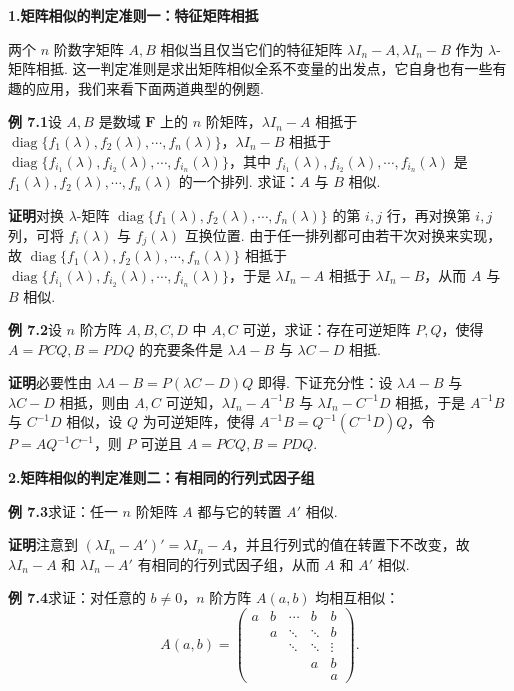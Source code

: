 \documentclass[UTF8,12pt,a4paper,fontset=fandol]{ctexart}
\begin{document}
\noindent\textbf{1.\quad 矩阵相似的判定准则一：特征矩阵相抵}

两个 $n$ 阶数字矩阵 $A,B$ 相似当且仅当它们的特征矩阵 $\lambda I_n-A,\lambda I_n-B$ 作为 $\lambda$-矩阵相抵. 这一判定准则是求出矩阵相似全系不变量的出发点，它自身也有一些有趣的应用，我们来看下面两道典型的例题.

\noindent\textbf{例 7.1}\quad 设 $A,B$ 是数域 $\mathbf{F}$ 上的 $n$ 阶矩阵，$\lambda I_n-A$ 相抵于 $\operatorname{diag}\{f_1(\lambda),f_2(\lambda),\cdots,f_n(\lambda)\}$，$\lambda I_n-B$ 相抵于 $\operatorname{diag}\{f_{i_1}(\lambda),f_{i_2}(\lambda),\cdots,f_{i_n}(\lambda)\}$，其中 $f_{i_1}(\lambda),f_{i_2}(\lambda),\cdots,f_{i_n}(\lambda)$ 是 $f_1(\lambda),f_2(\lambda),\cdots,f_n(\lambda)$ 的一个排列. 求证：$A$ 与 $B$ 相似.

\noindent\textbf{证明}\quad 对换 $\lambda$-矩阵 $\operatorname{diag}\{f_1(\lambda),f_2(\lambda),\cdots,f_n(\lambda)\}$ 的第 $i,j$ 行，再对换第 $i,j$ 列，可将 $f_i(\lambda)$ 与 $f_j(\lambda)$ 互换位置. 由于任一排列都可由若干次对换来实现，故 $\operatorname{diag}\{f_1(\lambda),f_2(\lambda),\cdots,f_n(\lambda)\}$ 相抵于 $\operatorname{diag}\{f_{i_1}(\lambda),f_{i_2}(\lambda),\cdots,f_{i_n}(\lambda)\}$，于是 $\lambda I_n-A$ 相抵于 $\lambda I_n-B$，从而 $A$ 与 $B$ 相似.

\noindent\textbf{例 7.2}\quad 设 $n$ 阶方阵 $A,B,C,D$ 中 $A,C$ 可逆，求证：存在可逆矩阵 $P,Q$，使得 $A=PCQ,B=PDQ$ 的充要条件是 $\lambda A-B$ 与 $\lambda C-D$ 相抵.

\noindent\textbf{证明}\quad 必要性由 $\lambda A-B=P(\lambda C-D)Q$ 即得. 下证充分性：设 $\lambda A-B$ 与 $\lambda C-D$ 相抵，则由 $A,C$ 可逆知，$\lambda I_n-A^{-1}B$ 与 $\lambda I_n-C^{-1}D$ 相抵，于是 $A^{-1}B$ 与 $C^{-1}D$ 相似，设 $Q$ 为可逆矩阵，使得 $A^{-1}B=Q^{-1}(C^{-1}D)Q$，令 $P=AQ^{-1}C^{-1}$，则 $P$ 可逆且 $A=PCQ,B=PDQ$.

\noindent\textbf{2.\quad 矩阵相似的判定准则二：有相同的行列式因子组}

\noindent\textbf{例 7.3}\quad 求证：任一 $n$ 阶矩阵 $A$ 都与它的转置 $A'$ 相似.

\noindent\textbf{证明}\quad 注意到 $(\lambda I_n-A')'=\lambda I_n-A$，并且行列式的值在转置下不改变，故 $\lambda I_n-A$ 和 $\lambda I_n-A'$ 有相同的行列式因子组，从而 $A$ 和 $A'$ 相似.

\noindent\textbf{例 7.4}\quad 求证：对任意的 $b\ne 0$，$n$ 阶方阵 $A(a,b)$ 均相互相似：
\[
A(a,b)=
\left(\begin{array}{ccccc}
a & b & \cdots & b & b\\
  & a & \ddots & \ddots & b\\
  &   & \ddots & \ddots & \vdots\\
  &   &        & a & b\\
  &   &        &   & a
\end{array}\right).
\]
\end{document}

